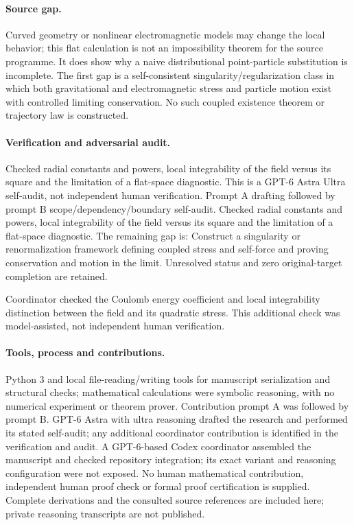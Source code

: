 \documentclass[11pt]{article}
\begin{document}
\paragraph{Source gap.} Curved geometry or nonlinear electromagnetic models may change the local behavior; this flat calculation is not an impossibility theorem for the source programme. It does show why a naive distributional point-particle substitution is incomplete. The first gap is a self-consistent singularity/regularization class in which both gravitational and electromagnetic stress and particle motion exist with controlled limiting conservation. No such coupled existence theorem or trajectory law is constructed.

\paragraph{Verification and adversarial audit.}
Checked radial constants and powers, local integrability of the field versus its square and the limitation of a flat-space diagnostic. This is a GPT-6 Astra Ultra self-audit, not independent human verification. Prompt A drafting followed by prompt B scope/dependency/boundary self-audit. Checked radial constants and powers, local integrability of the field versus its square and the limitation of a flat-space diagnostic. The remaining gap is: Construct a singularity or renormalization framework defining coupled stress and self-force and proving conservation and motion in the limit. Unresolved status and zero original-target completion are retained.

Coordinator checked the Coulomb energy coefficient and local integrability distinction between the field and its quadratic stress. This additional check was model-assisted, not independent human verification.

\paragraph{Tools, process and contributions.}
Python 3 and local file-reading/writing tools for manuscript serialization and structural checks; mathematical calculations were symbolic reasoning, with no numerical experiment or theorem prover. Contribution prompt A was followed by prompt B. GPT-6 Astra with ultra reasoning drafted the research and performed its stated self-audit; any additional coordinator contribution is identified in the verification and audit. A GPT-6-based Codex coordinator assembled the manuscript and checked repository integration; its exact variant and reasoning configuration were not exposed. No human mathematical contribution, independent human proof check or formal proof certification is supplied. Complete derivations and the consulted source references are included here; private reasoning transcripts are not published.
\end{document}

